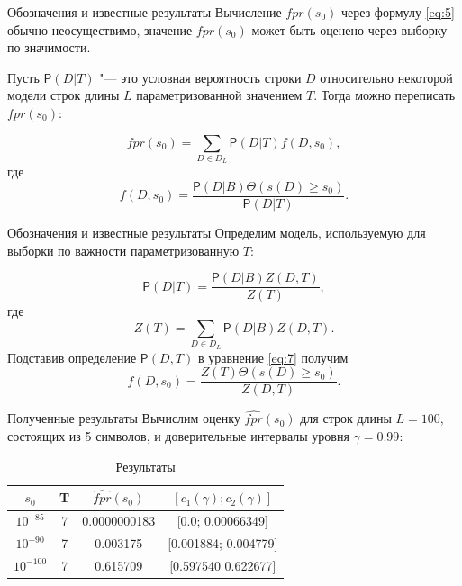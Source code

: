 \documentclass{beamer}
\begin{document}
	\begin{frame}{Обозначения и известные результаты}
		Вычисление $fpr(s_{0})$ через формулу \eqref{eq:5} обычно неосуществимо, значение $fpr(s_{0})$ может быть оценено через выборку по значимости. 
		
		\vspace{0.5cm}
		
		Пусть $\mathsf{P}(D|T)$ "--- это условная вероятность строки $D$ относительно некоторой модели строк длины $L$ параметризованной значением $T$. Тогда можно переписать $fpr(s_{0})$:		
		
		\begin{equation*}
			fpr(s_{0}) = \sum_{D \in D_{L}} \mathsf{P}(D|T) f(D,s_{0}), \label{eq:6}
		\end{equation*}
		где
		\begin{equation}
			f(D,s_{0}) = \frac{\mathsf{P}(D|B) \Theta(s(D) \geq s_{0})}{\mathsf{P}(D|T)}. \label{eq:7}
		\end{equation}				
	\end{frame}

	\begin{frame}{Обозначения и известные результаты}
		Определим модель, используемую для выборки по важности параметризованную $T$:		
		
		\begin{equation*}
			\mathsf{P}(D|T) = \frac{\mathsf{P}(D|B)Z(D,T)}{Z(T)}, \label{eq:8}
		\end{equation*}							
		где 
		\begin{equation*}
			Z(T) = \sum_{D \in D_{L}}\mathsf{P}(D|B)Z(D,T). \label{eq:9}
		\end{equation*}
		Подставив определение $\mathsf{P}(D,T)$ в уравнение \eqref{eq:7} получим
		\begin{equation*}
			f(D,s_{0}) = \frac{Z(T)\Theta(s(D) \geq s_{0})}{Z(D,T)}. \label{eq:10}
		\end{equation*}	
	\end{frame}

	\begin{frame}{Полученные результаты}
		Вычислим оценку $\widehat{fpr}(s_{0})$ для строк длины $L=100$, состоящих из 5 символов, и доверительные интервалы уровня $\gamma = 0.99$:		
		\begin{table}
			\caption{Результаты} \label{tb:1}
			\begin{tabular}{cccc}
				$s_{0}$&T&$\widehat{fpr}(s_{0})$&$[c_{1}(\gamma);c_{2}(\gamma)]$  \\ \hline
				$10^{-85}$&7&0.0000000183&[0.0; 0.00066349] \\
				$10^{-90}$&7&0.003175&[0.001884; 0.004779] \\ 
				$10^{-100}$&7&0.615709&[0.597540 0.622677] \\
			\end{tabular}
		\end{table}								
	\end{frame}
\end{document}
